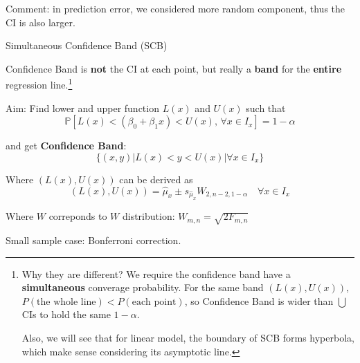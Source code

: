     Comment: in prediction error, we considered more random component, thus the CI is also larger.
    
    


    \begin{point}
       Simultaneous Confidence Band (SCB)
    \end{point}

    Confidence Band is \textbf{not} the CI at each point, but really a \textbf{band} for the \textbf{entire} regression line.\footnote{Why they are different? We require the confidence band have a \textbf{simultaneous} converage probability. For the same band $ (L(x),U(x)) $, $ P(\text{the whole line})< P(\text{each point})$, so Confidence Band is wider than $ \bigcup $CIs to hold the same $ 1-\alpha $.
    
    Also, we will see that for linear model, the boundary of SCB forms hyperbola, which make sense considering its asymptotic line.}
    
    
    Aim: Find lower and upper function $ L(x) $ and $ U(x) $ such that
    \begin{equation}
        \mathbb{P}[L(x)<(\beta _0+\beta _1x)<U(x),\,\forall x\in I_x]=1-\alpha  
    \end{equation}
    
    and get \textbf{Confidence Band}:
    \begin{equation}
        \{(x,y)|L(x)<y<U(x)|\forall x\in I_x\} 
    \end{equation}
    

    Where $ (L(x),U(x)) $ can be derived as
    \begin{equation}
        (L(x),U(x))=\hat{\mu}_x\pm s_{\hat{\mu}_x}W_{2,n-2,1-\alpha}\quad \forall x\in I_x
    \end{equation}

    Where $ W $ correponds to $ W $ distribution: $ W_{m,n}=\sqrt{2F_{m,n}} $
    
    
    
    Small sample case: Bonferroni correction.
    

